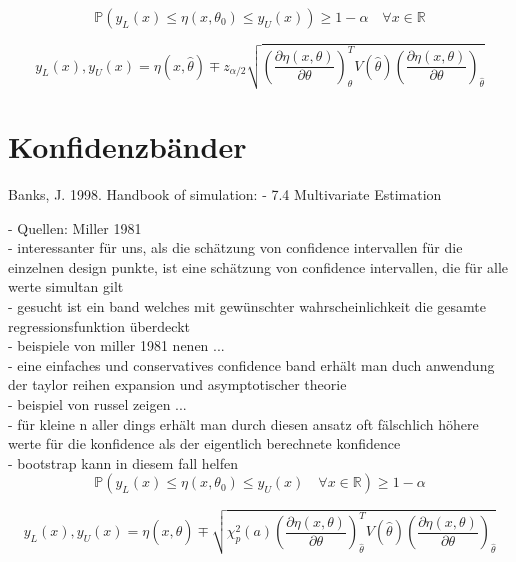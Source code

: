 \begin{equation}
\mathbb{P} \left(
  y_L(x) \le \eta(x, \theta_0) \le y_U(x)
\right) \geq 1-\alpha
\quad \forall x \in \mathbb{R}
\end{equation}

\begin{equation}
y_L(x), y_U(x) = \eta(x, \hat\theta) \mp 
z_{\alpha/2} 
\sqrt{
  \left( 
    \frac{\partial\eta(x, \theta)}{\partial\theta} 
  \right)_{\hat\theta}^T 
  V(\hat\theta) 
  \left( 
    \frac{\partial\eta(x, \theta)}{\partial\theta} 
  \right)_{\hat\theta}
}
\end{equation}


\section{Konfidenzbänder}
Banks, J. 1998. Handbook of simulation: 
- 7.4 Multivariate Estimation

- Quellen: Miller 1981\\
- interessanter für uns, als die schätzung von confidence intervallen für die einzelnen design punkte, ist eine schätzung von confidence intervallen, die für alle werte simultan gilt\\
- gesucht ist ein band welches mit gewünschter wahrscheinlichkeit die gesamte regressionsfunktion überdeckt\\
- beispiele von miller 1981 nenen ...\\
- eine einfaches und conservatives confidence band erhält man duch anwendung der taylor reihen expansion und asymptotischer theorie\\
- beispiel von russel zeigen ...\\
- für kleine n aller dings erhält man durch diesen ansatz oft fälschlich höhere werte für die konfidence als der eigentlich berechnete konfidence\\
- bootstrap kann in diesem fall helfen\\

\begin{equation}
\mathbb{P} \left(
  y_L(x) \le \eta(x, \theta_0) \le y_U(x) 
  \quad \forall x \in \mathbb{R}
\right) \geq 1-\alpha
\end{equation}

\begin{equation}
y_L(x), y_U(x) = \eta(x, \hat\theta) \mp 
\sqrt{
  \chi_p^2(a)
  \left( 
    \frac{\partial\eta(x, \theta)}{\partial\theta} 
  \right)_{\hat\theta}^T 
  V(\hat\theta) 
  \left( 
    \frac{\partial\eta(x, \theta)}{\partial\theta} 
  \right)_{\hat\theta}
}
\end{equation}


